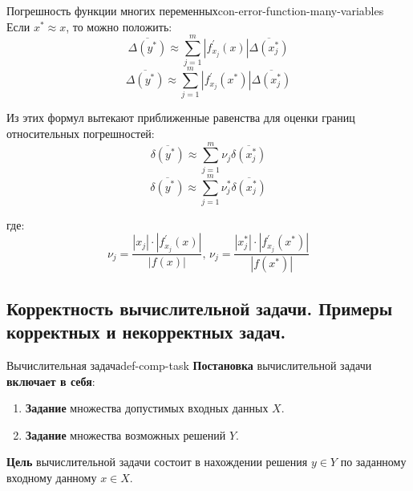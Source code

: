 \documentclass[14pt]{extarticle}
\begin{document}
        \begin{consequence}{Погрешность функции многих переменных}{con-error-function-many-variables}
            Если $x^{*} \approx x$, то можно положить:
            $$\overline{\Delta(y^{*})} \approx \sum_{j=1}^{m}|f_{x_{j}}^{'}(x)|\overline{\Delta(x_{j}^{*})}$$
            $$\overline{\Delta(y^{*})} \approx \sum_{j=1}^{m}|f_{x_{j}}^{'}(x^{*})|\overline{\Delta(x_{j}^{*})}$$
        
            \vspace{\baselineskip}
        
            Из этих формул вытекают приближенные равенства для оценки границ относительных погрешностей:
            $$\overline{\delta(y^{*})} \approx \sum_{j=1}^{m} \nu_{j}\overline{\delta(x_{j}^{*})}$$
            $$\overline{\delta(y^{*})} \approx \sum_{j=1}^{m} \nu_{j}^{*}\overline{\delta(x_{j}^{*})}$$
        
            где:
            $$\nu_{j} = \frac{|x_{j}|\cdot|f_{x_{j}}^{'}(x)|}{|f(x)|} \text{, } \nu_{j} = \frac{|x_{j}^{*}|\cdot|f_{x_{j}}^{'}(x^{*})|}{|f(x^{*})|}$$
        \end{consequence}

\clearpage
\subsection{Корректность вычислительной задачи. Примеры корректных и некорректных задач.}
    
    \begin{definition}{Вычислительная задача}{def-comp-task}
        \textbf{Постановка} вычислительной задачи \textbf{включает в себя}: 
        \begin{enumerate}
            \item \textbf{Задание} множества допустимых входных данных $X$.
            \item \textbf{Задание} множества возможных решений $Y$. 
        \end{enumerate}

        \vspace{\baselineskip}

        \textbf{Цель} вычислительной задачи состоит в нахождении решения $y \in Y$ по заданному входному данному $x \in X$.
    \end{definition}
\end{document}
